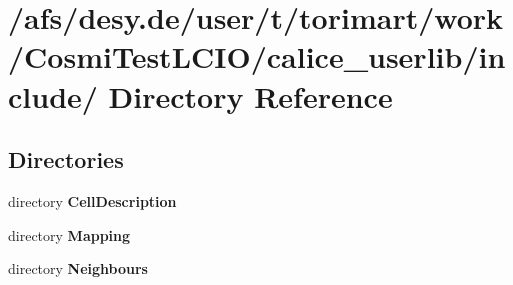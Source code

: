\section{/afs/desy.de/user/t/torimart/work/CosmiTestLCIO/calice\_\-userlib/include/ Directory Reference}
\label{dir_57be4fcabe5c93cdea47fb40369601ff}
\subsection*{Directories}
\begin{DoxyCompactItemize}
\item 
directory {\bf CellDescription}
\item 
directory {\bf Mapping}
\item 
directory {\bf Neighbours}
\end{DoxyCompactItemize}
